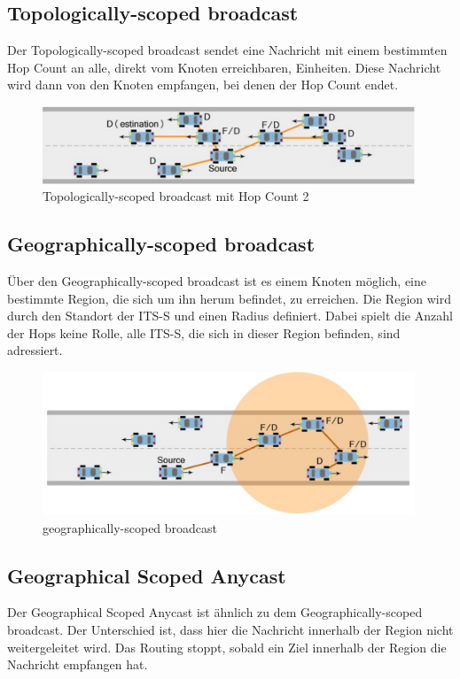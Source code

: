 \subsection{Topologically-scoped broadcast}
Der Topologically-scoped broadcast sendet eine Nachricht mit einem bestimmten Hop Count an alle, direkt vom  Knoten erreichbaren, Einheiten. Diese Nachricht wird dann von den Knoten empfangen, bei denen der Hop Count endet.

\begin{figure}
	\includegraphics[width=0.99\textwidth]{content/images/03_networklayer/TSC.png}
	\caption{Topologically-scoped broadcast mit Hop Count 2 \cite{etsi102636-1}}
	\label{fig:tsc}
\end{figure}


\subsection{Geographically-scoped broadcast}
Über den Geographically-scoped broadcast ist es einem Knoten möglich, eine bestimmte Region, die sich um ihn herum befindet, zu erreichen. Die Region wird durch den Standort der \ac{ITS-S} und einen Radius definiert. Dabei spielt die Anzahl der Hops keine Rolle, alle \ac{ITS-S}, die sich in dieser Region befinden, sind adressiert.

\begin{figure}
	\includegraphics[width=0.99\textwidth]{content/images/03_networklayer/GSB.png}
	\caption{geographically-scoped broadcast \cite{etsi102636-1}}
	\label{fig:gsb}
\end{figure}

\subsection{Geographical Scoped Anycast}
Der Geographical Scoped Anycast ist ähnlich zu dem Geographically-scoped broadcast. Der Unterschied ist, dass hier die Nachricht innerhalb der Region nicht weitergeleitet wird. Das Routing stoppt, sobald ein Ziel innerhalb der Region die Nachricht empfangen hat.

